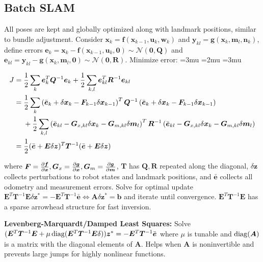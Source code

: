 \documentclass[twocolumn, 8pt]{extarticle}
\newenvironment{tight}
  {\begingroup
   \setlength{\arraycolsep}{2pt}
   \thinmuskip=3mu       %
   \medmuskip=2mu        %
   \thickmuskip=3mu      %
  }
  {
    \endgroup
  }
\begin{document}
\subsection{Batch SLAM}

All poses are kept and globally optimized along with landmark positions, similar to bundle adjustment.
Consider $\bm x_k = \bm f(\bm x_{k - 1}, \bm u_k, \bm w_k)$ and $\bm y_{kl} = \bm g(\bm x_k, \bm m_l, \bm n_k)$, define
errors $\bm e_k = \bm x_k - \bm f(\bm x_{k - 1}, \bm u_k, \bm 0) \sim \mathcal N(\bm 0, \bm Q)$ and 
$\bm e_{kl} = \bm y_{kl} - \bm g(\bm x_k, \bm m_l, \bm 0) \sim \mathcal N(\bm 0, \bm R)$. Minimize error:
\begin{tight}
  \begin{align*}
    J &= \frac{1}{2}\sum _k \bm e_k^T\bm Q^{-1}\bm e_k + \frac{1}{2}\sum _{k,l} \bm e_{kl}^T\bm R^{-1}\bm e_{kl} \\
      &= \alignedlines[t]{}{\frac{1}{2}\sum _k \left(\bar{\bm e}_k + \delta\bm x_k - \bm F_{k - 1}\delta\bm x_{k - 1}\right)^T\bm Q^{-1}\left(\bar{\bm e}_k + \delta\bm x_k - \bm F_{k - 1}\delta\bm x_{k - 1}\right)}{+ \frac{1}{2}\sum _{k, l} \left(\bar{\bm e}_{kl} - \bm G_{x,kl}\delta\bm x_k - \bm G_{m,kl}\delta\bm m_l\right)^T\bm R^{-1}\left(\bar{\bm e}_{kl} - \bm G_{x,kl}\delta\bm x_k - \bm G_{m,kl}\delta\bm m_l\right)} \\
      &= \frac{1}{2}(\bar{\bm e} + \bm E\delta\bm z)^T\bm T^{-1}(\bar{\bm e} + \bm E\delta\bm z)
  \end{align*}
\end{tight}

where \(\bm F = \frac{\partial\bm f}{\partial\bm x}, \bm G_x = \frac{\partial\bm g}{\partial\bm x}, \bm G_m = \frac{\partial\bm g}{\partial\bm m}\), \(\bm T\) has
\(\bm Q, \bm R\) repeated along the diagonal, \(\delta\bm z\) collects perturbations to robot states and landmark
positions, and \(\bar{\bm e}\) collects all odometry and measurement errors.
Solve for optimal update \(\bm E^T\bm T^{-1}\bm E\delta\bm z^* = -\bm E^T\bm T^{-1}\bar{\bm e} \iff \bm A\delta\bm z^* = \bm b\)
and iterate until convergence. \(\bm E^T\bm T^{-1}\bm E\) has a sparse arrowhead structure for fast inversion.

\textbf{Levenberg-Marquardt/Damped Least Squares:} Solve $(\bm E^T\bm T^{-1}\bm E + \mu\operatorname{diag}(\bm E^T\bm T^{-1}\bm
E\delta))\bm z^* = -\bm E^T\bm T^{-1}\bar{\bm e}$ where $\mu$ is tunable and $\operatorname{diag}(\bm A)$ is a matrix with the
diagonal elements of \(\bm A\). Helps when \(\bm A\) is noninvertible and prevents large jumps for highly nonlinear
functions.
\end{document}
